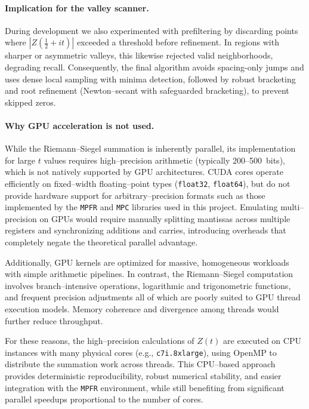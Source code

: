 \documentclass[11pt,a4paper]{article}
\begin{document}
\paragraph{Implication for the valley scanner.}
During development we also experimented with prefiltering by discarding points where \(|Z(\tfrac{1}{2}+it)|\) exceeded a threshold before refinement. In regions with sharper or asymmetric valleys, this likewise rejected valid neighborhoods, degrading recall. Consequently, the final algorithm avoids spacing-only jumps and uses dense local sampling with minima detection, followed by robust bracketing and root refinement (Newton--secant with safeguarded bracketing), to prevent skipped zeros.

\paragraph{Why GPU acceleration is not used.}
While the Riemann--Siegel summation is inherently parallel, its implementation for large \( t \) values requires
high--precision arithmetic (typically 200--500~bits), which is not natively supported by GPU architectures.
CUDA cores operate efficiently on fixed--width floating--point types (\texttt{float32}, \texttt{float64}),
but do not provide hardware support for arbitrary--precision formats such as those implemented by
the \texttt{MPFR} and \texttt{MPC} libraries used in this project.
Emulating multi--precision on GPUs would require manually splitting mantissas across multiple registers
and synchronizing additions and carries, introducing overheads that completely negate the theoretical
parallel advantage.

Additionally, GPU kernels are optimized for massive, homogeneous workloads with simple arithmetic pipelines.
In contrast, the Riemann--Siegel computation involves
branch--intensive operations, logarithmic and trigonometric functions,
and frequent precision adjustments all of which are poorly suited to GPU thread execution models.
Memory coherence and divergence among threads would further reduce throughput.

For these reasons, the high--precision calculations of \( Z(t) \) are executed on
CPU instances with many physical cores (e.g., \texttt{c7i.8xlarge}), using OpenMP to distribute the
summation work across threads.
This CPU--based approach provides deterministic reproducibility, robust numerical stability,
and easier integration with the \texttt{MPFR} environment,
while still benefiting from significant parallel speedups proportional to the number of cores.
\end{document}
